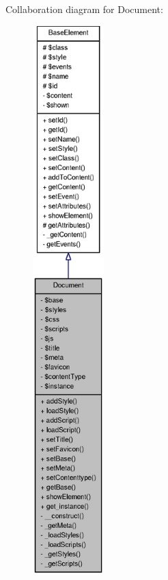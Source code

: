 Collaboration diagram for Document:\nopagebreak
\begin{figure}[H]
\begin{center}
\leavevmode
\includegraphics[height=600pt]{classDocument__coll__graph}
\end{center}
\end{figure}
